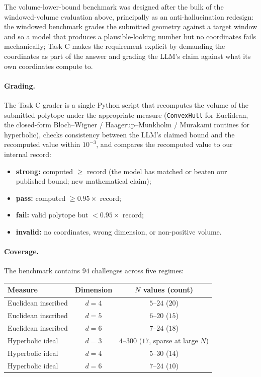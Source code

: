 \documentclass[11pt]{article}
\begin{document}
The volume-lower-bound benchmark was designed after the bulk of the
windowed-volume evaluation above, principally as an
anti-hallucination redesign: the windowed benchmark grades the
submitted geometry against a target window and so a model that
produces a plausible-looking number but no coordinates fails
mechanically; Task C makes the requirement explicit by demanding
the coordinates as part of the answer and grading the LLM's claim
against what its own coordinates compute to.

\paragraph{Grading.}
The Task C grader is a single Python script that recomputes the
volume of the submitted polytope under the appropriate measure
(\texttt{ConvexHull} for Euclidean, the closed-form Bloch--Wigner /
Haagerup--Munkholm / Murakami routines for hyperbolic), checks
consistency between the LLM's claimed bound and the recomputed
value within $10^{-3}$, and compares the recomputed value to our
internal record:
\begin{itemize}
\item \textbf{strong:} computed $\geq$ record (the model has matched
      or beaten our published bound; new mathematical claim);
\item \textbf{pass:} computed $\geq 0.95 \times$ record;
\item \textbf{fail:} valid polytope but $< 0.95 \times$ record;
\item \textbf{invalid:} no coordinates, wrong dimension, or
      non-positive volume.
\end{itemize}

\paragraph{Coverage.}
The benchmark contains $94$ challenges across five regimes:

\begin{center}
\begin{tabular}{l c c}
\toprule
Measure & Dimension & $N$ values (count) \\
\midrule
Euclidean inscribed & $d = 4$ & $5$--$24$ ($20$) \\
Euclidean inscribed & $d = 5$ & $6$--$20$ ($15$) \\
Euclidean inscribed & $d = 6$ & $7$--$24$ ($18$) \\
Hyperbolic ideal    & $d = 3$ & $4$--$300$ ($17$, sparse at large $N$) \\
Hyperbolic ideal    & $d = 4$ & $5$--$30$ ($14$) \\
Hyperbolic ideal    & $d = 6$ & $7$--$24$ ($10$) \\
\bottomrule
\end{tabular}
\end{center}
\end{document}
